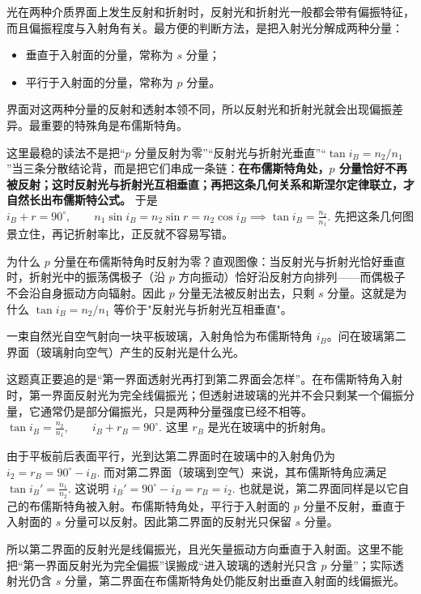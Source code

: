 \documentclass[lang=cn,11pt]{elegantbook}
\begin{document}
光在两种介质界面上发生反射和折射时，反射光和折射光一般都会带有偏振特征，而且偏振程度与入射角有关。最方便的判断方法，是把入射光分解成两种分量：
\begin{itemize}
 \item 垂直于入射面的分量，常称为 \(s\) 分量；
 \item 平行于入射面的分量，常称为 \(p\) 分量。
\end{itemize}
界面对这两种分量的反射和透射本领不同，所以反射光和折射光就会出现偏振差异。最重要的特殊角是布儒斯特角。

这里最稳的读法不是把“\(p\) 分量反射为零”“反射光与折射光垂直”“\(\tan i_B=n_2/n_1\)”当三条分散结论背，而是把它们串成一条链：\textbf{在布儒斯特角处，\(p\) 分量恰好不再被反射；这时反射光与折射光互相垂直；再把这条几何关系和斯涅尔定律联立，才自然长出布儒斯特公式。} 于是
 \(i_B+r=90^\circ,\qquad n_1\sin i_B=n_2\sin r=n_2\cos i_B \implies \tan i_B=\frac{n_2}{n_1}.\) 
先把这条几何图景立住，再记折射率比，正反就不容易写错。

\begin{remark}
为什么 \(p\) 分量在布儒斯特角时反射为零？直观图像：当反射光与折射光恰好垂直时，折射光中的振荡偶极子（沿 \(p\) 方向振动）恰好沿反射方向排列——而偶极子不会沿自身振动方向辐射。因此 \(p\) 分量无法被反射出去，只剩 \(s\) 分量。这就是为什么 \(\tan i_B=n_2/n_1\) 等价于"反射光与折射光互相垂直"。
\end{remark}

\begin{exercise}[在布儒斯特角入射到平板玻璃时第二界面的反射光是什么光]
一束自然光自空气射向一块平板玻璃，入射角恰为布儒斯特角 \(i_B\)。问在玻璃第二界面（玻璃射向空气）产生的反射光是什么光。
\end{exercise}

\begin{solution}
这题真正要追的是“第一界面透射光再打到第二界面会怎样”。在布儒斯特角入射时，第一界面反射光为完全线偏振光；但透射进玻璃的光并不会只剩某一个偏振分量，它通常仍是部分偏振光，只是两种分量强度已经不相等。
 \(\tan i_B=\frac{n_2}{n_1},\qquad i_B+r_B=90^\circ.\) 
这里 \(r_B\) 是光在玻璃中的折射角。

由于平板前后表面平行，光到达第二界面时在玻璃中的入射角仍为
 \(i_2=r_B=90^\circ-i_B.\) 
而对第二界面（玻璃到空气）来说，其布儒斯特角应满足
 \(\tan i_B'=\frac{n_1}{n_2}.\) 
这说明
 \(i_B'=90^\circ-i_B=r_B=i_2.\) 
也就是说，第二界面同样是以它自己的布儒斯特角被入射。布儒斯特角处，平行于入射面的 \(p\) 分量不反射，垂直于入射面的 \(s\) 分量可以反射。因此第二界面的反射光只保留 \(s\) 分量。

所以第二界面的反射光是线偏振光，且光矢量振动方向垂直于入射面。这里不能把“第一界面反射光为完全偏振”误搬成“进入玻璃的透射光只含 \(p\) 分量”；实际透射光仍含 \(s\) 分量，第二界面在布儒斯特角处仍能反射出垂直入射面的线偏振光。
\end{solution}
\end{document}
